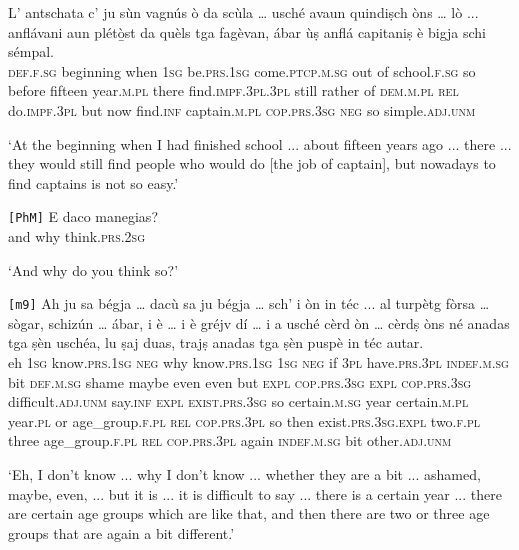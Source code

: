\begin{linenumbers}
	\gll L’ antschata c’ ju sùn vagnús ò da scùla … usché avaun quindiṣch òns … lò ... anflávani aun plétò̱st da quèls tga fagèvan, ábar ùṣ anflá capitaniṣ è bigja schi sémpal.   \\
\textsc{def.f.sg} beginning when \textsc{1sg} be.\textsc{prs.1sg} come.\textsc{ptcp.m.sg} out of school.\textsc{f.sg} {} so before fifteen year.\textsc{m.pl} {} there {} find.\textsc{impf.3pl.3pl} still rather of \textsc{dem.m.pl} \textsc{rel} do.\textsc{impf.3pl} but now find.\textsc{inf} captain.\textsc{m.pl} \textsc{cop.prs.3sg} \textsc{neg} so simple.\textsc{adj.unm}\\
\end{linenumbers}
\medskip
\glt `At the beginning when I had finished school ... about fifteen years ago ... there ... they would still find people who would do [the job of captain], but nowadays to find captains is not so easy.'
\medskip

\begin{linenumbers}
	\gll  \texttt{[PhM]} E daco manegias?\\
	{} and why think.\textsc{prs.2sg}\\
\end{linenumbers}
\medskip
\glt `And why do you think so?'

\begin{linenumbers}
	\gll \texttt{[m9]} Ah ju sa bégja … dacù sa ju bégja … sch’ i òn in téc ... al turpètg fòrsa … sògar, schizún\footnotemark{} … ábar, i è … i è gréjv dí … i a usché cèrd òn … cèrdṣ òns né anadas tga ṣèn uschéa, lu ṣaj duas, trajṣ anadas tga ṣèn puspè in téc autar.\\
{} eh \textsc{1sg} know.\textsc{prs.1sg} \textsc{neg} {} why know.\textsc{prs.1sg} \textsc{1sg} \textsc{neg} {} if \textsc{3pl} have.\textsc{prs.3pl} \textsc{indef.m.sg} bit {} \textsc{def.m.sg} shame maybe {} even even {} but \textsc{expl} \textsc{cop.prs.3sg} {} \textsc{expl} \textsc{cop.prs.3sg} difficult.\textsc{adj.unm} say.\textsc{inf} {} \textsc{expl} \textsc{exist.prs.3sg} so certain.\textsc{m.sg} year {} certain.\textsc{m.pl} year.\textsc{pl} or age\_group.\textsc{f.pl} \textsc{rel} \textsc{cop.prs.3pl} so then exist.\textsc{prs.3sg.expl} two.\textsc{f.pl} three age\_group.\textsc{f.pl} \textsc{rel} \textsc{cop.prs.3pl} again \textsc{indef.m.sg} bit other.\textsc{adj.unm}\\
\end{linenumbers}
\medskip
\glt `Eh, I don't know ... why I don't know ... whether they are a bit ... ashamed, maybe, even, ... but it is ... it is difficult to say ... there is a certain year ... there are certain age groups which are like that, and then there are two or three age groups that are again a bit different.'
\medskip

